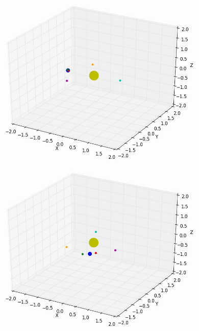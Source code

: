 \documentclass[10pt,letterpaper]{article}
\begin{document}
\begin{figure}[!htb]
  \includegraphics[width=\linewidth]{figures/lagrange_points/lagrange_points_l4_vy_001_1.png}
  \subcaption{}\label{fig:lagrange_points_l4_vy_001_fig1}
\endminipage\hfill
{}
  \includegraphics[width=\linewidth]{figures/lagrange_points/lagrange_points_l4_vy_001_2.png}
  \subcaption{}\label{fig:lagrange_points_l4_vy_001_fig2}
\endminipage\hfill
{}%

\end{figure}
\end{document}
